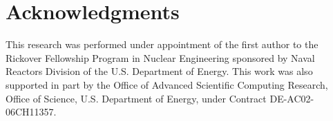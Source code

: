 \documentclass{snamc2013}
\begin{document}
\section*{Acknowledgments}

This research was performed under appointment of the first author to the
Rickover Fellowship Program in Nuclear Engineering sponsored by Naval Reactors
Division of the U.S. Department of Energy. This work was also supported in part
by the Office of Advanced Scientific Computing Research, Office of Science,
U.S. Department of Energy, under Contract DE-AC02-06CH11357.



\end{document}
